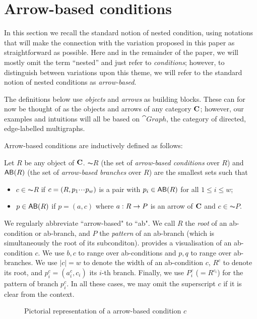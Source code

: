 \section{Arrow-based conditions}

In this section we recall the standard notion of nested condition, using notations that will make the connection with the variation proposed in this paper as straightforward as possible. Here and in the remainder of the paper, we will mostly omit the term ``nested'' and just refer to \emph{conditions}; however, to distinguish between variations upon this theme, we will refer to the standard notion of nested conditions as \emph{arrow-based}.

The definitions below use \emph{objects} and \emph{arrows} as building blocks. These can for now be thought of as the objects and arrows of any category $\mathbf{C}$; however, our examples and intuitions will all be based on $\cat{Graph}$, the category of directed, edge-labelled multigraphs. 

Arrow-based conditions are inductively defined as follows:

\begin{definition}
  Let $R$ be any object of $\mathbf{C}$. $\AC R$ (the set of \emph{arrow-based conditions} over $R$) and $\AB R$ (the set of \emph{arrow-based branches} over $R$) are the smallest sets such that
  \begin{itemize}
  \item $c\in \AC R$ if $c=(R,p_1{\cdotp\mkern-2mu\cdotp\mkern-2mu\cdotp\mkern1mu} p_w)$ is a pair with $p_i\in \AB R$ for all $1\leq i\leq w$;
  \item $p\in \AB R$ if $p=(a,c)$ where $a: R\rightarrow P$ is an arrow of $\mathbf{C}$ and $c\in \AC P$.
  \end{itemize}
\end{definition}
%
We regularly abbreviate ``arrow-based" to ``ab". We call $R$ the \emph{root} of an ab-condition or ab-branch, and $P$ the \emph{pattern} of an ab-branch (which is simultaneously the root of its subconditon).  provides a visualisation of an ab-condition $c$. We use $b,c$ to range over ab-conditions and $p,q$ to range over ab-branches. We use $|c|=w$ to denote the width of an ab-condition $c$, $R^c$ to denote its root, and $p^c_i=(a^c_i,c_i)$ its $i$-th branch. Finally, we use $P^c_i$ ($=R^{c_i}$) for the pattern of branch $p^c_i$. In all these cases, we may omit the superscript $c$ if it is clear from the context.
%
\begin{figure}
  \centering
  
  \caption{Pictorial representation of a arrow-based condition $c$}
\end{figure}

